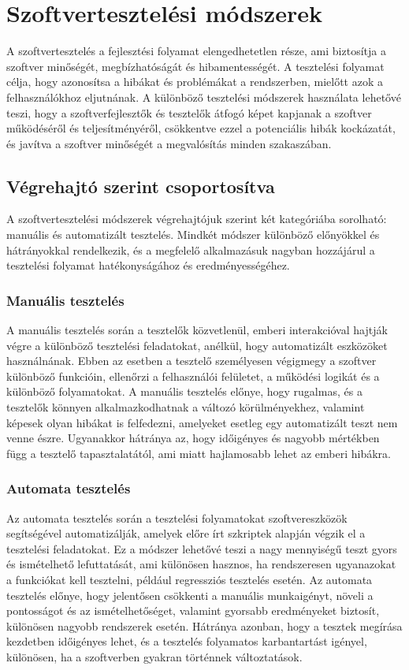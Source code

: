 \section{Szoftvertesztelési módszerek}
A szoftvertesztelés a fejlesztési folyamat elengedhetetlen része, ami biztosítja a szoftver minőségét, megbízhatóságát és hibamentességét.
A tesztelési folyamat célja, hogy azonosítsa a hibákat és problémákat a rendszerben, mielőtt azok a felhasználókhoz eljutnának.
A különböző tesztelési módszerek használata lehetővé teszi, hogy a szoftverfejlesztők és tesztelők átfogó képet kapjanak a szoftver működéséről és teljesítményéről, csökkentve ezzel a potenciális hibák kockázatát, és javítva a szoftver minőségét a megvalósítás minden szakaszában.
\subsection{Végrehajtó szerint csoportosítva}
A szoftvertesztelési módszerek végrehajtójuk szerint két kategóriába sorolható: manuális és automatizált tesztelés.
Mindkét módszer különböző előnyökkel és hátrányokkal rendelkezik, és a megfelelő alkalmazásuk nagyban hozzájárul a tesztelési folyamat hatékonyságához és eredményességéhez.
\subsubsection{Manuális tesztelés}
A manuális tesztelés során a tesztelők közvetlenül, emberi interakcióval hajtják végre a különböző tesztelési feladatokat, anélkül, hogy automatizált eszközöket használnának.
Ebben az esetben a tesztelő személyesen végigmegy a szoftver különböző funkcióin, ellenőrzi a felhasználói felületet, a működési logikát és a különböző folyamatokat.
A manuális tesztelés előnye, hogy rugalmas, és a tesztelők könnyen alkalmazkodhatnak a változó körülményekhez, valamint képesek olyan hibákat is felfedezni, amelyeket esetleg egy automatizált teszt nem venne észre.
Ugyanakkor hátránya az, hogy időigényes és nagyobb mértékben függ a tesztelő tapasztalatától, ami miatt hajlamosabb lehet az emberi hibákra.
\subsubsection{Automata tesztelés}
Az automata tesztelés során a tesztelési folyamatokat szoftvereszközök segítségével automatizálják, amelyek előre írt szkriptek alapján végzik el a tesztelési feladatokat.
Ez a módszer lehetővé teszi a nagy mennyiségű teszt gyors és ismételhető lefuttatását, ami különösen hasznos, ha rendszeresen ugyanazokat a funkciókat kell tesztelni, például regressziós tesztelés esetén.
Az automata tesztelés előnye, hogy jelentősen csökkenti a manuális munkaigényt, növeli a pontosságot és az ismételhetőséget, valamint gyorsabb eredményeket biztosít, különösen nagyobb rendszerek esetén.
Hátránya azonban, hogy a tesztek megírása kezdetben időigényes lehet, és a tesztelés folyamatos karbantartást igényel, különösen, ha a szoftverben gyakran történnek változtatások.
